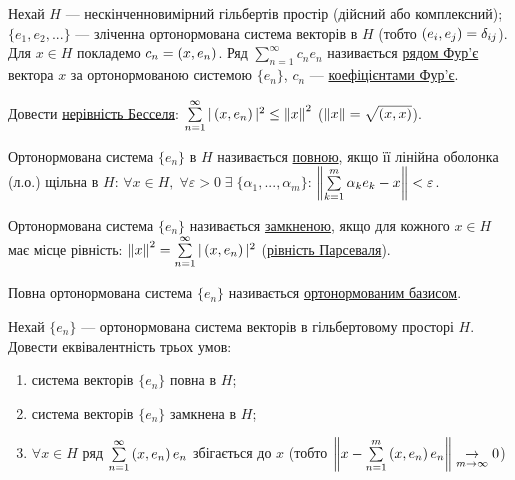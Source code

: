 
\begin{theory}
    Нехай $H$ --- нескінченновимірний гільбертів простір (дійсний або комплексний); 
    $\{e_1, e_2, ...\}$ --- зліченна ортонормована система векторів в $H$ (тобто $\left(e_i, e_j\right) 
    = \delta_{ij}$). Для $x \in H$ покладемо $c_n = \left(x, e_n\right)$. Ряд $\sum\limits_{n=1}^\infty 
    c_n e_n$ називається \underline{рядом Фур'є} вектора $x$ за ортонормованою системою 
    $\{e_n\}$, $c_n$ --- \underline{коефіцієнтами Фур'є}.
\end{theory}

\begin{exercise}
    Довести \underline{нерівність Бесселя}: $\sum\limits_{n=1}^\infty |\left(x, e_n\right)|^2 \leq 
    \left\lVert x\right\rVert^2$ ($\left\lVert x\right\rVert = \sqrt{\left(x, x\right)}$).
\end{exercise}

\begin{theory}
    
    Ортонормована система $\{e_n\}$ в $H$ називається \underline{повною}, якщо її лінійна 
    оболонка (л.о.) щільна в $H$:
     $\forall x \in H, \;\forall \varepsilon > 0 \; \exists \; \{\alpha_1, ..., 
    \alpha_m\}$: $\left\lVert\sum\limits_{k=1}^m \alpha_k e_k - x\right\rVert < \varepsilon$.

    \noindent Ортонормована система $\{e_n\}$ називається \underline{замкненою}, якщо для кожного 
    $x \in H$ має місце рівність: $\left\lVert x\right\rVert^2 = \sum\limits_{n=1}^\infty |\left(x, e_n\right)|^2$ 
    (\underline{рівність Парсеваля}).

    \noindent Повна ортонормована система $\{e_n\}$ називається \ul{ортонормованим 
    базисом}.
\end{theory}

\begin{exercise}
    Нехай $\{e_n\}$ --- ортонормована система векторів в гільбертовому просторі $H$. 
    Довести еквівалентність трьох умов:
    \begin{enumerate}[label=\ukr*)]
        \item система векторів $\{e_n\}$ повна в $H$;
        \item система векторів $\{e_n\}$ замкнена в $H$;
        \item $\forall x \in H$ ряд $\sum\limits_{n=1}^\infty \left(x, e_n\right)e_n$ збігається до $x$
        (тобто $\left\lVert x - \sum\limits_{n=1}^m \left(x, e_n\right)e_n\right\rVert
        \underset{m\rightarrow\infty}{\rightarrow}0$)
    \end{enumerate}
\end{exercise}

